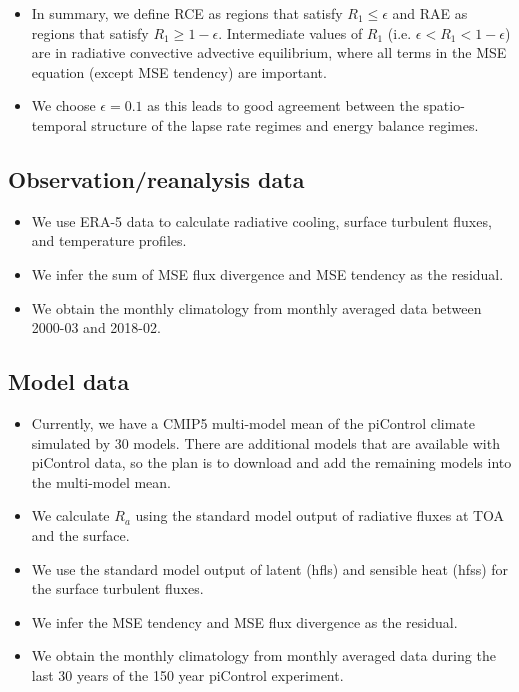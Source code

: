\documentclass{ametsocV5}
\begin{document}
\begin{itemize}
  \item In summary, we define RCE as regions that satisfy \(R_{1}\le\epsilon\) and RAE as regions that satisfy \(R_{1}\ge 1-\epsilon\). Intermediate values of \(R_{1}\) (i.e. \(\epsilon < R_{1} < 1-\epsilon\)) are in radiative convective advective equilibrium, where all terms in the MSE equation (except MSE tendency) are important.
  \item We choose \(\epsilon=0.1\) as this leads to good agreement between the spatio-temporal structure of the lapse rate regimes and energy balance regimes.
\end{itemize}

\subsection{Observation/reanalysis data}
\begin{itemize}
  \item We use ERA-5 data to calculate radiative cooling, surface turbulent fluxes, and temperature profiles.
  \item We infer the sum of MSE flux divergence and MSE tendency as the residual.
  \item We obtain the monthly climatology from monthly averaged data between 2000-03 and 2018-02.
\end{itemize}

\subsection{Model data}
\begin{itemize}
  \item Currently, we have a CMIP5 multi-model mean of the piControl climate simulated by 30 models. There are additional models that are available with piControl data, so the plan is to download and add the remaining models into the multi-model mean.
  \item We calculate \(R_{a}\) using the standard model output of radiative fluxes at TOA and the surface.
  \item We use the standard model output of latent (hfls) and sensible heat (hfss) for the surface turbulent fluxes.
  \item We infer the MSE tendency and MSE flux divergence as the residual.
  \item We obtain the monthly climatology from monthly averaged data during the last 30 years of the 150 year piControl experiment.
\end{itemize}
\end{document}
